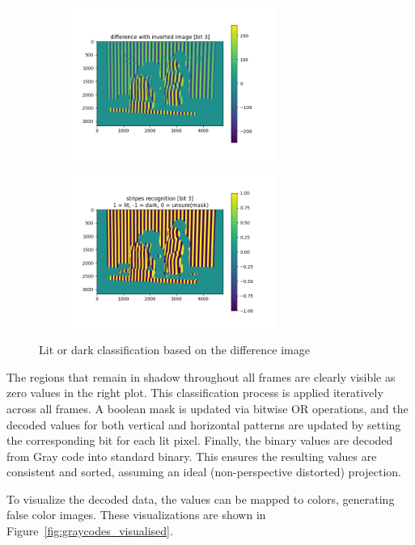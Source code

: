 \documentclass{report}
\begin{document}
\begin{figure}[H]
    \centering
    \begin{subfigure}[b]{0.45\linewidth}
        \centering
        \includegraphics[height=50mm, keepaspectratio]{report_images/1_gray_codes/diff.png}
    \end{subfigure}
    \hfill
    \begin{subfigure}[b]{0.45\linewidth}
        \centering
        \includegraphics[height=50mm, keepaspectratio]{report_images/1_gray_codes/class.png}
    \end{subfigure}
    \caption{Lit or dark classification based on the difference image}
    \label{fig:graycode}
\end{figure}

The regions that remain in shadow throughout all frames are clearly visible as zero values in the right plot. This classification process is applied iteratively across all frames. A boolean mask is updated via bitwise OR operations, and the decoded values for both vertical and horizontal patterns are updated by setting the corresponding bit for each lit pixel. Finally, the binary values are decoded from Gray code into standard binary. This ensures the resulting values are consistent and sorted, assuming an ideal (non-perspective distorted) projection.

To visualize the decoded data, the values can be mapped to colors, generating false color images. These visualizations are shown in Figure~\ref{fig:graycodes_visualised}.
\end{document}
